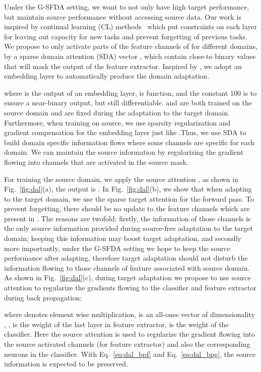 \documentclass[10pt,twocolumn,letterpaper]{article}
\begin{document}
Under the G-SFDA setting, we want to not only have high target performance, but maintain source performance without accessing source data.  Our work is inspired by continual learning (CL) methods~\cite{abati2020conditional,mallya2018packnet,serra2018overcoming} which put constraints on each layer for leaving out capacity for new tasks and prevent forgetting of previous tasks.
We propose to only activate parts of the feature channels of  for different domains, by a sparse domain attention (SDA) vector , which contain close-to binary values that will mask the output of the feature extractor. Inspired by \cite{serra2018overcoming}, we adopt an embedding layer to automatically produce the domain adaptation.

where  is the output of an embedding layer,  is  function, and the constant 100 is to ensure a near-binary output, but still differentiable. 
 and  are both trained on the source domain and are fixed during the adaptation to the target domain. Furthermore, when training on source, we use sparsity regularization and gradient compensation for the embedding layer just like \cite{serra2018overcoming}.Thus, we use SDA to build domain specific information flows where some channels are specific for each domain. We can maintain the source information by regularizing the gradient flowing into channels that are activated in the source mask. 

For training the source domain, we apply the source attention , as shown in Fig.~\ref{fig:dal}(a), the output is . 
In Fig.~\ref{fig:dal}(b), we show that when adapting to the target domain, we use the sparse target attention  for the forward pass. To prevent forgetting, there should be no update to the feature channels which are present in . The reasons are twofold: firstly, the information of those channels is the only source information provided during source-free adaptation to the target domain; keeping this information may boost target adaptation, and secondly more importantly, under the G-SFDA setting we hope to keep the source performance after adapting,  therefore target adaptation should not disturb the information flowing to those channels of feature associated with source domain. As shown in Fig.~\ref{fig:dal}(c), during target adaptation we propose to use source attention  to regularize the gradients flowing to the classifier and feature extractor during back propagation:

where  denotes element wise multiplication,  is an all-ones vector of dimensionality , ,  is the weight of the last layer in feature extractor,  is the weight of the classifier. Here the source attention  is used to regularize the gradient flowing into the source activated channels (for feature extractor) and also the corresponding neurons in the classifier. With Eq.~\ref{eq:dal_bpf} and Eq.~\ref{eq:dal_bpg}, the source information is expected to be preserved.
\end{document}
